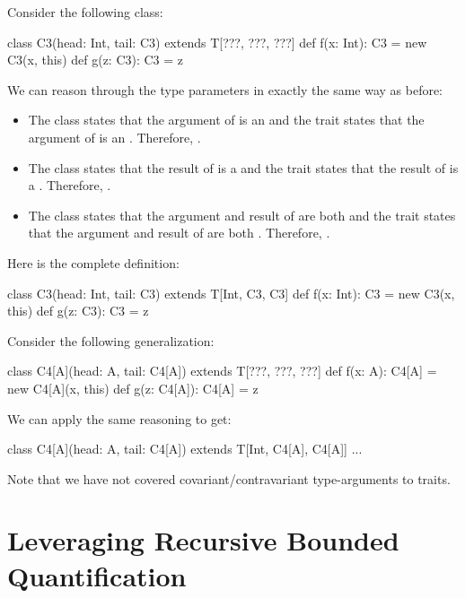 \documentclass[9pt]{extbook}
\begin{document}
Consider the following class:
\begin{scalacode}
class C3(head: Int, tail: C3) extends T[???, ???, ???] {
  def f(x: Int): C3 = new C3(x, this)
  def g(z: C3): C3 = z
}
\end{scalacode}
We can reason through the type parameters in exactly the same way as before:
\begin{itemize}
  \item The class states that the argument of  is an 
  and the trait states that the argument of  is an .
  Therefore, .

  \item The class states that the result of  is a 
  and the trait states that the result of  is a .
  Therefore, .

  \item The class states that the argument and result of  are both 
  and the trait states that the argument and result of  are both .
  Therefore, .
\end{itemize}
Here is the complete definition:
\begin{scalacode}
class C3(head: Int, tail: C3) extends T[Int, C3, C3] {
  def f(x: Int): C3 = new C3(x, this)
  def g(z: C3): C3 = z
}
\end{scalacode}

Consider the following generalization:
\begin{scalacode}
class C4[A](head: A, tail: C4[A]) extends T[???, ???, ???] {
  def f(x: A): C4[A] = new C4[A](x, this)
  def g(z: C4[A]): C4[A] = z
}
\end{scalacode}

We can apply the same reasoning to get:
\begin{scalacode}
class C4[A](head: A, tail: C4[A]) extends T[Int, C4[A], C4[A]] { ... }
\end{scalacode}

\begin{instructor}
Note that we have not covered covariant/contravariant type-arguments to traits.
\end{instructor}

\section{Leveraging Recursive Bounded Quantification}
\end{document}
